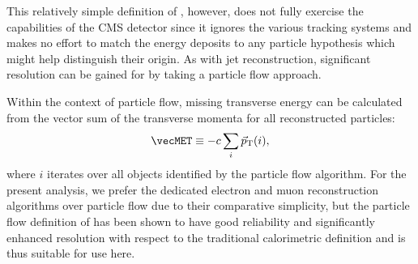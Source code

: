 This relatively simple definition of \MET, however, does not fully exercise the capabilities of the CMS detector since it ignores the various tracking systems and makes no effort to match the energy deposits to any particle hypothesis which might help distinguish their origin.  As with jet reconstruction, significant resolution can be gained for \MET by taking a particle flow approach.

Within the context of particle flow, missing transverse energy can be calculated from the vector sum of the transverse momenta for all reconstructed particles:
\begin{equation}
  \vecMET \equiv - c \sum_{i} \vec{p}_\text{T}(i),
\end{equation}
where $i$ iterates over all objects identified by the particle flow algorithm.  For the present analysis, we prefer the dedicated electron and muon reconstruction algorithms over particle flow due to their comparative simplicity, but the particle flow definition of \MET has been shown to have good reliability and significantly enhanced resolution with respect to the traditional calorimetric definition and is thus suitable for use here.

